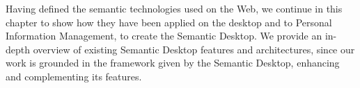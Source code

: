 Having defined the semantic technologies used on the Web, we continue in this chapter to show how they have been applied on the desktop and to Personal Information Management, to create the Semantic Desktop. We provide an in-depth overview of existing Semantic Desktop features and architectures, since our work is grounded in the framework given by the Semantic Desktop, enhancing and complementing its features. 




